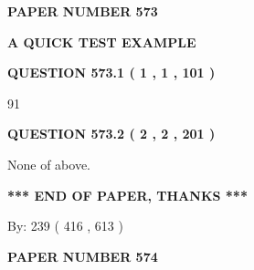 \documentclass[12pt]{article}
\begin{document}
   
   
   
\newpage 
\setcounter{page}{ 
   573001 } 
   
   
   
   
 {\textbf{ \Large{ PAPER NUMBER  573  }}}
   
   
\vspace{0.2in}
   
   
   
   
   
   
 \vspace{0.2in}
{\LARGE {\textbf{ A QUICK TEST EXAMPLE}}}
   
   
  
\vspace{0.2in}
  
{\textbf{\Large{QUESTION
573.1 
 ( 1 , 1 , 101 )
}}}
  
  
 
 
\noindent{}

91
 
 
  
\vspace{0.2in}
  
{\textbf{\Large{QUESTION
573.2 
 ( 2 , 2 , 201 )
}}}
  
  
 
 
\noindent{}
 
 
 None of above.
 
 
 
 
   
   
 \vspace{0.2in}
 
   
   
   
   
\vspace{1.0in} 
{\textbf{\large{ *** END OF PAPER, THANKS *** }}} 
   
   
\hspace{1.0in} By: 
 239 ( 416 ,  613 )
   
   
   
   
\newpage 
\setcounter{page}{ 
   574001 } 
   
   
   
   
 {\textbf{ \Large{ PAPER NUMBER  574  }}}
   
\end{document}
